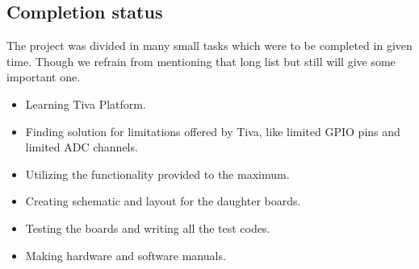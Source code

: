 \documentclass[a4paper,12pt,oneside]{book}
\begin{document}
\subsection*{Completion status}
The project was divided in many small tasks which were to be completed in given time. Though we refrain from mentioning that long list but still will give some important one.
\begin{itemize}
	\item Learning Tiva Platform.
	\item Finding solution for limitations offered by Tiva, like limited GPIO pins and limited ADC channels.
	\item Utilizing the functionality provided to the maximum.
	\item Creating schematic and layout for the daughter boards.
	\item Testing the boards and writing all the test codes.
	\item Making hardware and software manuals.
\end{itemize}
\end{document}
